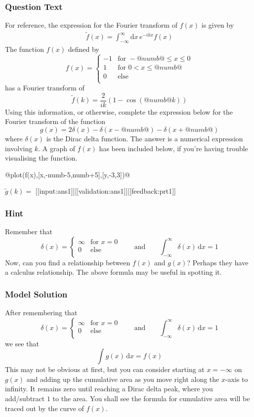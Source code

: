 \documentclass[a4paper,10pt]{article}
\begin{document}
\subsubsection{Question Text}
For reference, the expression for the Fourier transform of $f(x)$ is given by \begin{align*}
\tilde{f}(x) = \int_{-\infty}^{\infty} \text{d}x \, e^{-ikx}f(x)
\end{align*}The function \(f(x)\) defined by \[ f(x) = \begin{cases} -1 & \text{for } -@numb@ \leq x \leq 0\\ 1 & \text{for } 0 < x \leq @numb@\\ 0 & \text{else} \\ \end{cases} \] has a Fourier transform of \[ \tilde{f}(k) = \frac{2}{ik}(1-\cos(@numb@k)) \] Using this information, or otherwise, complete the expression below for the Fourier transform of the function \[ g(x) = 2\delta(x)-\delta(x-@numb@)-\delta(x+@numb@) \] where \(\delta(x)\) is the Dirac delta function. The answer is a numerical expression involving $k$. A graph of \(f(x)\) has been included below, if you're having trouble visualising the function. 

@plot(f(x),[x,-numb-5,numb+5],[y,-3,3])@

\(\tilde{g}(k) = \) [[input:ans1]][[validation:ans1]][[feedback:prt1]]
\subsubsection{Hint}
Remember that \[\delta(x) = \begin{cases} \infty & \text{for } x=0\\ 0 & \text{else} \\ \end{cases} \qquad \text{and} \qquad \int_{-\infty}^{\infty} \delta(x) \, \text{d}x = 1\] Now, can you find a relationship between \(f(x)\) and \(g(x)\)? Perhaps they have a calculus relationship. The above formula may be useful in spotting it.
\subsubsection{Model Solution}
After remembering that \[\delta(x) = \begin{cases} \infty & \text{for } x=0\\ 0 & \text{else} \\ \end{cases} \qquad \text{and} \qquad \int_{-\infty}^{\infty} \delta(x) \, \text{d}x = 1\] we see that \[ \int g(x) \, \text{d}x = f(x) \] This may not be obvious at first, but you can consider starting at \(x=-\infty\) on \(g(x)\) and adding up the cumulative area as you move right along the \(x\)-axis to infinity. It remains zero until reaching a Dirac delta peak, where you add/subtract $1$ to the area. You shall see the formula for cumulative area will be traced out by the curve of \(f(x)\).
\end{document}
